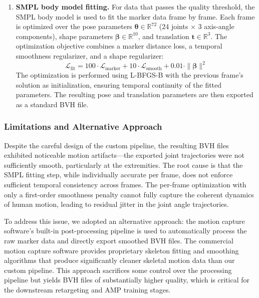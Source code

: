 \begin{enumerate}
    \item \textbf{SMPL body model fitting.} For data that passes the quality threshold, the SMPL body model is used to fit the marker data frame by frame. Each frame is optimized over the pose parameters $\boldsymbol{\theta} \in \mathbb{R}^{72}$ (24 joints $\times$ 3 axis-angle components), shape parameters $\boldsymbol{\beta} \in \mathbb{R}^{10}$, and translation $\mathbf{t} \in \mathbb{R}^{3}$. The optimization objective combines a marker distance loss, a temporal smoothness regularizer, and a shape regularizer:
    \begin{equation}
        \mathcal{L}_{\text{fit}} = 100 \cdot \mathcal{L}_{\text{marker}} + 10 \cdot \mathcal{L}_{\text{smooth}} + 0.01 \cdot \|\boldsymbol{\beta}\|^2
    \end{equation}
    The optimization is performed using L-BFGS-B with the previous frame's solution as initialization, ensuring temporal continuity of the fitted parameters. The resulting pose and translation parameters are then exported as a standard BVH file.
\end{enumerate}

\subsubsection{Limitations and Alternative Approach}

Despite the careful design of the custom pipeline, the resulting BVH files exhibited noticeable motion artifacts---the exported joint trajectories were not sufficiently smooth, particularly at the extremities. The root cause is that the SMPL fitting step, while individually accurate per frame, does not enforce sufficient temporal consistency across frames. The per-frame optimization with only a first-order smoothness penalty cannot fully capture the coherent dynamics of human motion, leading to residual jitter in the joint angle trajectories.

To address this issue, we adopted an alternative approach: the motion capture software's built-in post-processing pipeline is used to automatically process the raw marker data and directly export smoothed BVH files. The commercial motion capture software provides proprietary skeleton fitting and smoothing algorithms that produce significantly cleaner skeletal motion data than our custom pipeline. This approach sacrifices some control over the processing pipeline but yields BVH files of substantially higher quality, which is critical for the downstream retargeting and AMP training stages.

